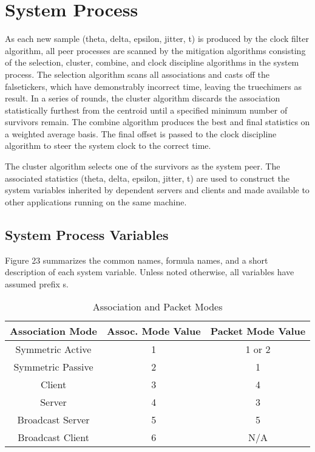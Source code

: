 \chapter{System Process}

As each new sample (theta, delta, epsilon, jitter, t) is produced by
the clock filter algorithm, all peer processes are scanned by the
mitigation algorithms consisting of the selection, cluster, combine,
and clock discipline algorithms in the system process.  The selection
algorithm scans all associations and casts off the falsetickers,
which have demonstrably incorrect time, leaving the truechimers as
result.  In a series of rounds, the cluster algorithm discards the
association statistically furthest from the centroid until a
specified minimum number of survivors remain.  The combine algorithm
produces the best and final statistics on a weighted average basis.
The final offset is passed to the clock discipline algorithm to steer
the system clock to the correct time.

The cluster algorithm selects one of the survivors as the system
peer.  The associated statistics (theta, delta, epsilon, jitter, t)
are used to construct the system variables inherited by dependent
servers and clients and made available to other applications running
on the same machine.

\section{System Process Variables}

Figure 23 summarizes the common names, formula names, and a short
description of each system variable.  Unless noted otherwise, all
variables have assumed prefix s.

\begin{table}[htb]
\center
\begin{tabular}{c | c | c}
Association Mode & Assoc. Mode Value & Packet Mode Value \\
\hline
\hline
Symmetric Active & 1 & 1 or 2 \\
Symmetric Passive & 2 & 1 \\
Client & 3 & 4 \\
Server & 4 & 3 \\
Broadcast Server & 5 & 5 \\
Broadcast Client & 6 & N/A \\
\hline
\end{tabular}
\label{association_and_packet_modes}
\caption{Association and Packet Modes}
\end{table}

